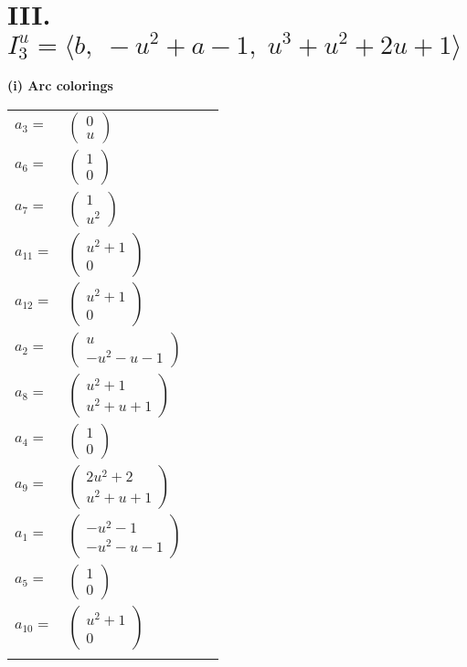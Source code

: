\documentclass[1p]{elsarticle_modified}
\theoremstyle{definition}
\begin{document}
\centering \section*{III. $I^u_{3}= \langle b,\;- u^2+a-1,\;u^3+u^2+2 u+1 \rangle$}
\flushleft \textbf{(i) Arc colorings}\\
\begin{tabular}{m{7pt} m{180pt} m{7pt} m{180pt} }
\flushright $a_{3}=$&$\begin{pmatrix}0\\u\end{pmatrix}$ \\
\flushright $a_{6}=$&$\begin{pmatrix}1\\0\end{pmatrix}$ \\
\flushright $a_{7}=$&$\begin{pmatrix}1\\u^2\end{pmatrix}$ \\
\flushright $a_{11}=$&$\begin{pmatrix}u^2+1\\0\end{pmatrix}$ \\
\flushright $a_{12}=$&$\begin{pmatrix}u^2+1\\0\end{pmatrix}$ \\
\flushright $a_{2}=$&$\begin{pmatrix}u\\- u^2- u-1\end{pmatrix}$ \\
\flushright $a_{8}=$&$\begin{pmatrix}u^2+1\\u^2+u+1\end{pmatrix}$ \\
\flushright $a_{4}=$&$\begin{pmatrix}1\\0\end{pmatrix}$ \\
\flushright $a_{9}=$&$\begin{pmatrix}2 u^2+2\\u^2+u+1\end{pmatrix}$ \\
\flushright $a_{1}=$&$\begin{pmatrix}- u^2-1\\- u^2- u-1\end{pmatrix}$ \\
\flushright $a_{5}=$&$\begin{pmatrix}1\\0\end{pmatrix}$ \\
\flushright $a_{10}=$&$\begin{pmatrix}u^2+1\\0\end{pmatrix}$\\&\end{tabular}
\end{document}
